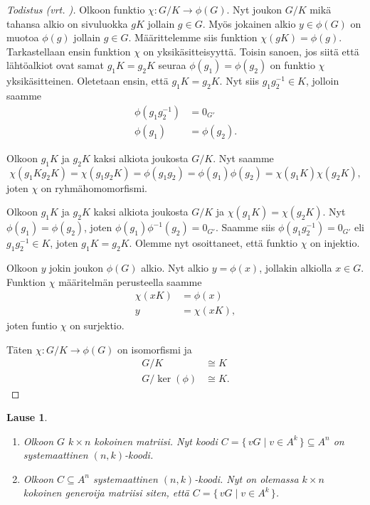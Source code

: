 \documentclass[a4paper,12pt,leqno,oneside]{report} %
\theoremstyle{plain}
\newtheorem{lause}{Lause}[chapter]
\theoremstyle{plain}
\theoremstyle{definition}
\theoremstyle{remark}
\numberwithin{equation}{chapter}
\begin{document}
    \begin{proof}[Todistus \upshape(vrt. {\cite[s.~97]{PA}})]\label{tod:isomorfia}
        Olkoon funktio $\chi: G/K \rightarrow \phi(G)$. Nyt joukon $G/K$ mikä tahansa alkio on sivuluokka $gK$ jollain $g \in G$. Myös jokainen alkio $y \in \phi(G)$ on muotoa $\phi(g)$ jollain $g \in G$. Määrittelemme siis funktion $\chi(gK) = \phi(g)$. Tarkastellaan ensin funktion $\chi$ on yksikäsitteisyyttä. Toisin sanoen, jos siitä että lähtöalkiot ovat samat $g_1K = g_2K$ seuraa $\phi(g_1) = \phi(g_2)$ on funktio $\chi$ yksikäsitteinen.
        Oletetaan ensin, että $g_1K = g_2K$. Nyt siis $g_1g_2^{-1} \in K$, jolloin saamme
        \begin{align*}
            \phi(g_1g_2^{-1}) &= 0_{G'} \\
            \phi(g_1) &= \phi(g_2).
        \end{align*}

        Olkoon $g_1K$ ja $g_2K$ kaksi alkiota joukosta $G/K$. Nyt saamme
        \[
            \chi(g_1Kg_2K) = \chi(g_1g_2K) = \phi(g_1g_2) = \phi(g_1)\phi(g_2) = \chi(g_1K)\chi(g_2K),
        \]
        joten $\chi$ on ryhmähomomorfismi.

        Olkoon $g_1K$ ja $g_2K$ kaksi alkiota joukosta $G/K$ ja $\chi(g_1K) = \chi(g_2K)$.
        Nyt $\phi(g_1) = \phi(g_2)$, joten $\phi(g_1)\phi^{-1}(g_2) = 0_{G'}$. Saamme siis $\phi(g_1g_2^{-1}) = 0_{G'}$ eli $g_1g_2^{-1} \in K$, joten $g_1K = g_2K$. Olemme nyt osoittaneet, että funktio $\chi$ on injektio.

        Olkoon $y$ jokin joukon $\phi(G)$ alkio. Nyt alkio $y = \phi(x)$, jollakin alkiolla $x \in G$. Funktion $\chi$ määritelmän perusteella saamme 
        \begin{align*}
            \chi(xK) &= \phi(x) \\
            y &= \chi(xK),
        \end{align*}
        joten funtio $\chi$ on surjektio.

        Täten $\chi: G/K \rightarrow \phi(G)$ on isomorfismi ja
        \begin{align*}
            G/K &\cong K \\
            G/\ker(\phi) &\cong K.
        \end{align*}
    \end{proof} 

    \begin{lause}\label{lause:systemaattinen}
        \mbox{}
        \begin{enumerate}
            \item\label{kht:sysmatr} Olkoon $G$ $k \times n$ kokoinen matriisi. Nyt koodi $C = \{\, vG \mid v \in A^k\,\} \subseteq A^n$ on systemaattinen $(n, k)$-koodi.
            \item\label{kht:sysgenmatr} Olkoon $C \subseteq A^n$ systemaattinen $(n, k)$-koodi. Nyt on olemassa $k \times n$ kokoinen generoija matriisi siten, että $C = \{\, vG \mid v \in A^k\,\}$.
        \end{enumerate}
    \end{lause}
\end{document}
